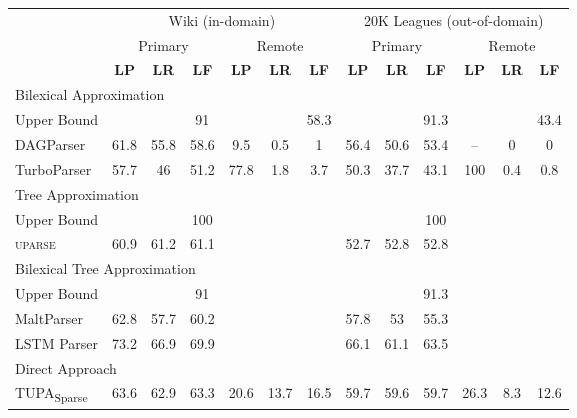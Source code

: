 \documentclass[11pt,a4paper]{article}
\newcommand{\parser}[1]{TUPA\textsubscript{#1}}
\begin{document}
\begin{table*}
\begin{tabular}{l|ccc|ccc||ccc|ccc}
& \multicolumn{6}{c||}{Wiki (in-domain)} & \multicolumn{6}{c}{20K Leagues (out-of-domain)} \\
& \multicolumn{3}{c|}{Primary} & \multicolumn{3}{c||}{Remote}
& \multicolumn{3}{c|}{Primary} & \multicolumn{3}{c}{Remote} \\
& \textbf{LP} & \textbf{LR} & \textbf{LF} & \textbf{LP} & \textbf{LR} & \textbf{LF}
& \textbf{LP} & \textbf{LR} & \textbf{LF} & \textbf{LP} & \textbf{LR} & \textbf{LF} \\
\hline
\multicolumn{4}{l}{\rule{0pt}{2ex} \footnotesize Bilexical Approximation} \\
\small Upper Bound
& & & \small 91 & & & \small 58.3
& & & \small 91.3 & & & \small 43.4 \\
DAGParser
& 61.8 & 55.8 & 58.6 & 9.5 & 0.5 & 1
& 56.4 & 50.6 & 53.4 & -- & 0 & 0 \\
TurboParser
& 57.7 & 46 & 51.2 & 77.8 & 1.8 & 3.7
& 50.3 & 37.7 & 43.1 & 100 & 0.4 & 0.8 \\
\hline
\multicolumn{4}{l}{\rule{0pt}{2ex} \footnotesize Tree Approximation} \\
\small Upper Bound
& & & \small 100 & & &
& & & \small 100 \\
\textsc{uparse}
& 60.9 & 61.2 & 61.1 & & &
& 52.7 & 52.8 & 52.8 \\
\hline
\multicolumn{4}{l}{\rule{0pt}{2ex} \footnotesize Bilexical Tree Approximation} \\
\small Upper Bound
& & & \small 91 & & &
& & & \small 91.3 \\
MaltParser
& 62.8 & 57.7 & 60.2 & & &
& 57.8 & 53 & 55.3 \\
LSTM Parser
& 73.2 & 66.9 & 69.9 & & &
& 66.1 & 61.1 & 63.5 \\
\hline
\multicolumn{4}{l}{\rule{0pt}{2ex} \footnotesize Direct Approach} \\
\parser{Sparse}
& 63.6 & 62.9 & 63.3 & 20.6 & 13.7 & 16.5
& 59.7 & 59.6 & 59.7 & 26.3 & 8.3 & 12.6 \\

\end{tabular}
\end{table*}
\end{document}

